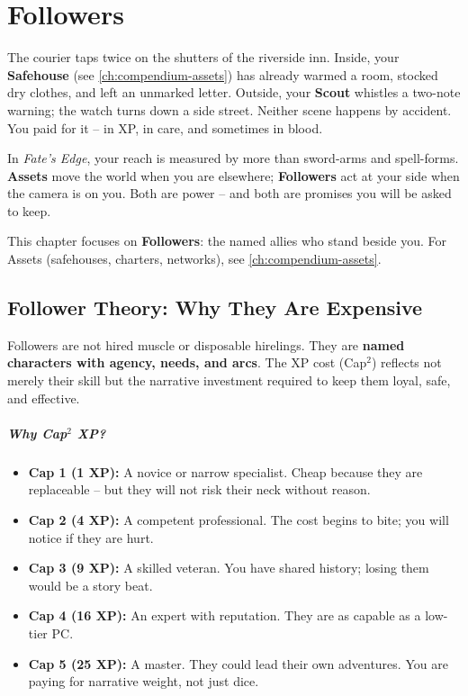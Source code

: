 \chapter{Followers}
\label{ch:followers}

\begin{tcolorbox}[colback=black!3!white,colframe=black!60!white,title=The Weight of a Name]
The courier taps twice on the shutters of the riverside inn. Inside, your \textbf{Safehouse} (see \ref{ch:compendium-assets}) has already warmed a room, stocked dry clothes, and left an unmarked letter. Outside, your \textbf{Scout} whistles a two-note warning; the watch turns down a side street. Neither scene happens by accident. You paid for it -- in XP, in care, and sometimes in blood.
\end{tcolorbox}

In \textit{Fate's Edge}, your reach is measured by more than sword-arms and spell-forms. \textbf{Assets} move the world when you are elsewhere; \textbf{Followers} act at your side when the camera is on you. Both are power -- and both are promises you will be asked to keep.

This chapter focuses on \textbf{Followers}: the named allies who stand beside you. For Assets (safehouses, charters, networks), see \ref{ch:compendium-assets}.

\section{Follower Theory: Why They Are Expensive}
\label{sec:follower-theory}

Followers are not hired muscle or disposable hirelings. They are \textbf{named characters with agency, needs, and arcs}. The XP cost (Cap\(^2\)) reflects not merely their skill but the narrative investment required to keep them loyal, safe, and effective.

\paragraph{Why Cap\(^2\) XP?}
\begin{itemize}
  \item \textbf{Cap 1 (1 XP):} A novice or narrow specialist. Cheap because they are replaceable -- but they will not risk their neck without reason.
  \item \textbf{Cap 2 (4 XP):} A competent professional. The cost begins to bite; you will notice if they are hurt.
  \item \textbf{Cap 3 (9 XP):} A skilled veteran. You have shared history; losing them would be a story beat.
  \item \textbf{Cap 4 (16 XP):} An expert with reputation. They are as capable as a low-tier PC.
  \item \textbf{Cap 5 (25 XP):} A master. They could lead their own adventures. You are paying for narrative weight, not just dice.
\end{itemize}

